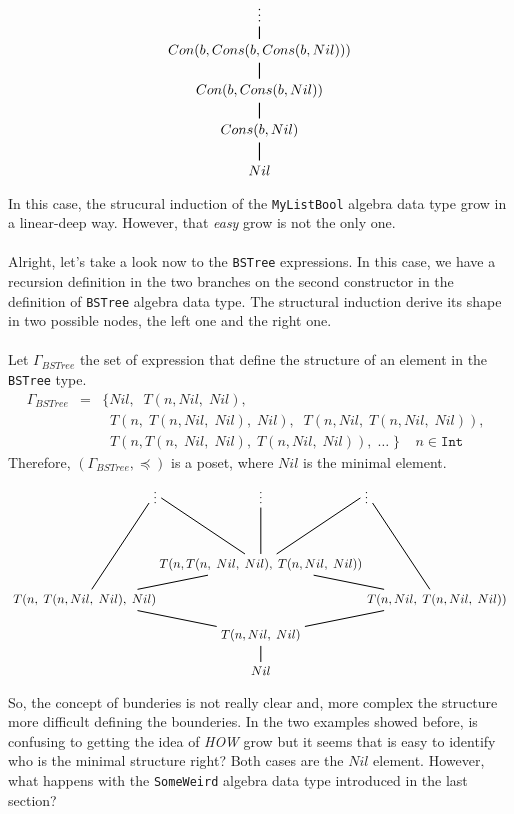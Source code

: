 \documentclass{report}
\theoremstyle{definition}
\theoremstyle{definition}
\newcommand{\ttt}[1]{\texttt{#1}}
\newcommand{\tav}{\;\;}
\begin{document}
\begin{align*}
\begin{tikzpicture}
	\node (a) at (0,3) {$\vdots$};
	\node (b) at (0,2) {$Con(b, Cons(b, Cons(b, Nil)))$};
	\node (c) at (0,1) {$Con(b, Cons(b, Nil))$};
	\node (d) at (0,0) {$Cons(b, Nil)$};
	\node (min) at (0,-1) {$Nil$};
	\draw [thick](min) -- (d) -- (c) -- (b) -- (a);
  \end{tikzpicture}
\end{align*}
In this case, the strucural induction of the \ttt{MyListBool} algebra data type grow in a linear-deep way. However, that \textit{easy} grow is not the only one.\\\\
Alright, let's take a look now to the \ttt{BSTree} expressions. In this case, we have a recursion definition in the two branches on the second constructor in the definition of \ttt{BSTree} algebra data type. The structural induction derive its shape in two possible nodes, the left one and the right one.\\\\
Let $\Gamma_{BSTree}$ the set of expression that define the structure of an element in the \ttt{BSTree} type.
\begin{eqnarray*}
	\Gamma_{BSTree} & = & \{ Nil, \tav T(n, Nil, \; Nil), \\
					&& \tav T(n, \; T(n, Nil, \; Nil), \; Nil), \tav T(n, Nil, \; T(n, Nil, \; Nil)), \tav  \\
					&& \tav T(n, T(n, \; Nil, \; Nil), \; T(n, Nil, \; Nil)), \; \ldots \; \} \tav \tav n \in \ttt{Int}
\end{eqnarray*}
Therefore, $(\Gamma_{BSTree}, \preceq)$ is a poset, where $Nil$ is the minimal element.
\begin{align*}
	\begin{tikzpicture}
		\node (a3) at (3,4) {$\vdots$};
		\node (a2) at (0,4) {$\vdots$};
		\node (a1) at (-3,4) {$\vdots$};
		\node (c2) at (0,2) {$T(n, T(n, \; Nil, \; Nil), \; T(n, Nil, \; Nil))$};
		\node (c3) at (5,1) {$T(n, Nil, \; T(n, Nil, \; Nil))$};
		\node (c1) at (-5,1) {$T(n, \; T(n, Nil, \; Nil), \; Nil)$};
		\node (d) at (0,0) {$T(n, Nil, \; Nil)$};
		\node (min) at (0,-1) {$Nil$};
		\draw [thick](min) -- (d) -- (c1) -- (c2) -- (a2);
		\draw [thick](c1) -- (a1);
		\draw [thick](c3) -- (a3);
		\draw [thick](c2) -- (a3);
		\draw [thick](d) -- (c3) -- (c2) -- (a1);
	\end{tikzpicture}
\end{align*}
So, the concept of bunderies is not really clear and, more complex the structure more difficult defining the bounderies. In the two examples showed before, is confusing to getting the idea of \textit{HOW} grow but it seems that is easy to identify who is the minimal structure right? Both cases are the $Nil$ element. However, what happens with the \ttt{SomeWeird} algebra data type introduced in the last section?\\\\
\end{document}
